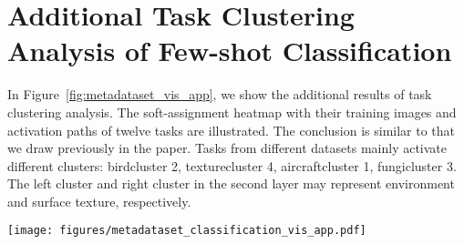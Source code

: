 \documentclass{article}
\begin{document}
\section{Additional Task Clustering Analysis of Few-shot Classification}
\label{app:task_relation_classification}
In Figure~\ref{fig:metadataset_vis_app}, we show the additional results of task clustering analysis. The soft-assignment heatmap with their training images and activation paths of twelve tasks are illustrated. The conclusion is similar to that we draw previously in the paper. Tasks from different datasets mainly activate different clusters: birdcluster 2, texturecluster 4, aircraftcluster 1, fungicluster 3. The left cluster and right cluster in the second layer may represent environment and surface texture, respectively. 
\begin{figure*}[!htbp]
    \centering
    \texttt{[image: figures/metadataset\_classification\_vis\_app.pdf]}
    \caption{Additional results of task clustering analysis of few-shot image classification problem.}
    \label{fig:metadataset_vis_app}
\end{figure*}
 \clearpage
\twocolumn


\end{document}

